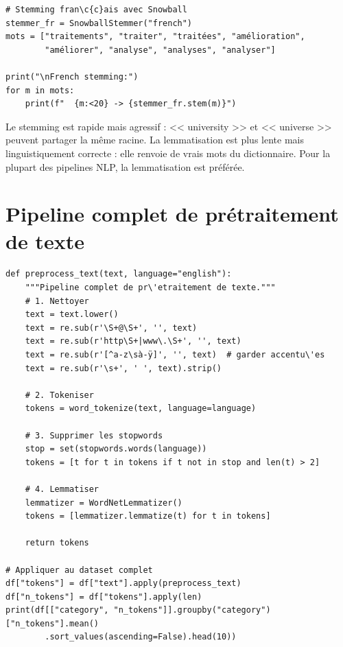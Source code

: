 \begin{verbatim}
# Stemming fran\c{c}ais avec Snowball
stemmer_fr = SnowballStemmer("french")
mots = ["traitements", "traiter", "traitées", "amélioration",
        "améliorer", "analyse", "analyses", "analyser"]

print("\nFrench stemming:")
for m in mots:
    print(f"  {m:<20} -> {stemmer_fr.stem(m)}")
\end{verbatim}

\begin{preprocesstip}
Le stemming est rapide mais agressif : << university >> et << universe >> peuvent partager la m\^eme racine. La lemmatisation est plus lente mais linguistiquement correcte : elle renvoie de vrais mots du dictionnaire. Pour la plupart des pipelines NLP, la lemmatisation est pr\'ef\'er\'ee.
\end{preprocesstip}

\section{Pipeline complet de pr\'etraitement de texte}

\begin{verbatim}
def preprocess_text(text, language="english"):
    """Pipeline complet de pr\'etraitement de texte."""
    # 1. Nettoyer
    text = text.lower()
    text = re.sub(r'\S+@\S+', '', text)
    text = re.sub(r'http\S+|www\.\S+', '', text)
    text = re.sub(r'[^a-z\sà-ÿ]', '', text)  # garder accentu\'es
    text = re.sub(r'\s+', ' ', text).strip()

    # 2. Tokeniser
    tokens = word_tokenize(text, language=language)

    # 3. Supprimer les stopwords
    stop = set(stopwords.words(language))
    tokens = [t for t in tokens if t not in stop and len(t) > 2]

    # 4. Lemmatiser
    lemmatizer = WordNetLemmatizer()
    tokens = [lemmatizer.lemmatize(t) for t in tokens]

    return tokens

# Appliquer au dataset complet
df["tokens"] = df["text"].apply(preprocess_text)
df["n_tokens"] = df["tokens"].apply(len)
print(df[["category", "n_tokens"]].groupby("category")["n_tokens"].mean()
        .sort_values(ascending=False).head(10))
\end{verbatim}

